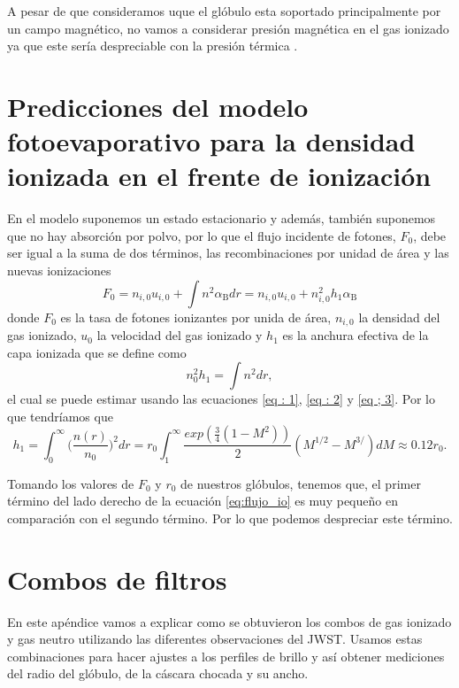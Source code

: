 \documentclass{book}
\begin{document}
A pesar de que consideramos uque el glóbulo esta soportado principalmente por un campo magnético, no vamos a considerar presión magnética en el gas ionizado ya que este sería despreciable con la presión térmica \citep{Will:2009}.

\chapter{Predicciones del modelo fotoevaporativo para la densidad ionizada en el frente de ionización }\label{App : tasa de fotoionizacion}

En el modelo suponemos un estado estacionario y además, también suponemos que no hay absorción por polvo, por lo que el flujo incidente de fotones, $F_0$, debe ser igual a la suma de dos términos, las recombinaciones por unidad de área y las nuevas ionizaciones
\begin{equation}\label{eq:flujo_io}
F_0 = n_{i,0} u_{i,0} +\int n^2\alpha_\mathrm{B}dr = n_{i,0}u_{i,0}+n_{i,0}^2h_1\alpha_\mathrm{B}
\end{equation}
donde $F_0$ es la tasa de fotones ionizantes por unida de área, $n_{i,0}$ la densidad del gas ionizado, $u_0$ la velocidad del gas ionizado y $h_1$ es la anchura efectiva de la capa ionizada que se define como
\begin{equation}
n_0^2h_1=\int n^2dr,
\end{equation}
el cual se puede estimar usando las ecuaciones  \ref{eq : 1}, \ref{eq : 2} y \ref{eq ; 3}. Por lo que tendríamos que 
\begin{equation}
h_1=\int_0^\infty \Big(\frac{n(r)}{n_0}\Big)^2dr=r_0\int_1^\infty\frac{exp(\frac{3}{4}(1-M^2))}{2}(M^{1/2}-M^{3/})dM\approx0.12r_0.\end{equation}

Tomando los valores de $F_0$ y $r_0$ de nuestros glóbulos, tenemos que, el primer término del lado derecho de la ecuación \ref{eq:flujo_io} es muy pequeño en comparación con el segundo término. Por lo que podemos despreciar este término.

\chapter{Combos de filtros}\label{AP: combos}

En este apéndice vamos a explicar como se obtuvieron los combos de gas ionizado y gas neutro utilizando las diferentes observaciones del JWST. Usamos estas combinaciones para hacer ajustes a los perfiles de brillo y así obtener mediciones del radio del glóbulo, de la cáscara chocada y su ancho.
\end{document}
